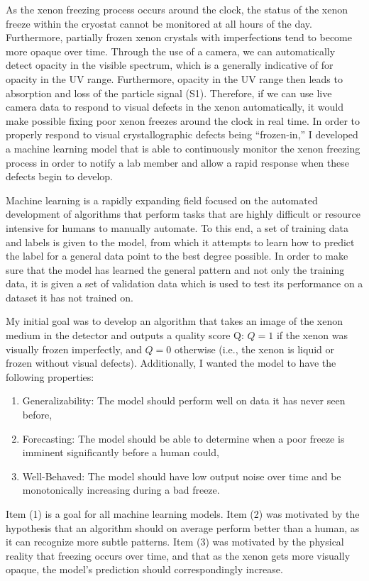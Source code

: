 \documentclass{article}
\begin{document}
As the xenon freezing process occurs around the clock, the status of the xenon freeze within the cryostat cannot be monitored at all hours of the day. Furthermore, partially frozen xenon crystals with imperfections tend to become more opaque over time. Through the use of a camera, we can automatically detect opacity in the visible spectrum, which is a generally indicative of for opacity in the UV range. Furthermore, opacity in the UV range then leads to absorption and loss of the particle signal (S1). Therefore, if we can use live camera data to respond to visual defects in the xenon automatically, it would make possible fixing poor xenon freezes around the clock in real time. In order to properly respond to visual crystallographic defects being ``frozen-in,'' I developed a machine learning model that is able to continuously monitor the xenon freezing process in order to notify a lab member and allow a rapid response when these defects begin to develop.

Machine learning is a rapidly expanding field focused on the automated development of algorithms that perform tasks that are highly difficult or resource intensive for humans to manually automate. To this end, a set of training data and labels is given to the model, from which it attempts to learn how to predict the label for a general data point to the best degree possible. In order to make sure that the model has learned the general pattern and not only the training data, it is given a set of validation data which is used to test its performance on a dataset it has not trained on.

My initial goal was to develop an algorithm that takes an image of the xenon medium in the detector and outputs a quality score Q: $Q=1$ if the xenon was visually frozen imperfectly, and $Q=0$ otherwise (i.e., the xenon is liquid or frozen without visual defects). Additionally, I wanted the model to have the following properties:
\begin{enumerate}
    \item Generalizability: The model should perform well on data it has never seen before,
    \item Forecasting: The model should be able to determine when a poor freeze is imminent significantly before a human could,
    \item Well-Behaved: The model should have low output noise over time and be monotonically increasing during a bad freeze.
\end{enumerate}
Item (1) is a goal for all machine learning models. Item (2) was motivated by the hypothesis that an algorithm should on average perform better than a human, as it can recognize more subtle patterns. Item (3) was motivated by the physical reality that freezing occurs over time, and that as the xenon gets more visually opaque, the model's prediction should correspondingly increase.
\end{document}
